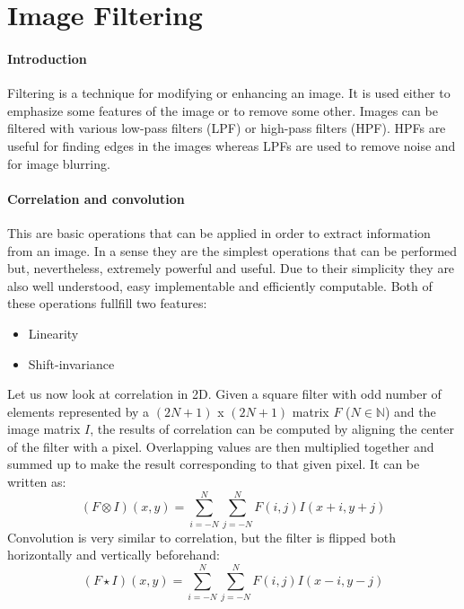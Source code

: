 \section{Image Filtering}
\paragraph{Introduction}
Filtering is a technique for modifying or enhancing an image. It is used either to emphasize some features of the image or to remove some other. Images can be filtered with various low-pass filters (LPF) or high-pass filters (HPF). HPFs are useful for finding edges in the images whereas LPFs are used to remove noise and for image blurring.

\paragraph{Correlation and convolution}\cite{correlation-convolution}
This are basic operations that can be applied in order to extract information from an image. In a sense they are the simplest operations that can be performed but, nevertheless, extremely powerful and useful. Due to their simplicity they are also well understood, easy implementable and efficiently computable. Both of these operations fullfill two features:
\begin{itemize}
	\item Linearity
	\item Shift-invariance
\end{itemize}
Let us now look at correlation in 2D. Given a square filter with odd number of elements represented by a $(2N + 1)$ x $(2N + 1)$ matrix $F$ ($N \in \mathbb{N}$) and the image matrix $I$, the results of correlation can be computed by aligning the center of the filter with a pixel. Overlapping values are then multiplied together and summed up to make the result corresponding to that given pixel. It can be written as:
\begin{equation}
	(F \otimes I)(x, y) = \sum_{i = -N}^{N}\sum_{j = -N}^{N}F(i, j)I(x + i, y + j)
\end{equation}
Convolution is very similar to correlation, but the filter is flipped both horizontally and vertically beforehand:
\begin{equation}
	(F \star I)(x, y) = \sum_{i = -N}^{N}\sum_{j = -N}^{N}F(i, j)I(x - i, y - j)
\end{equation}

